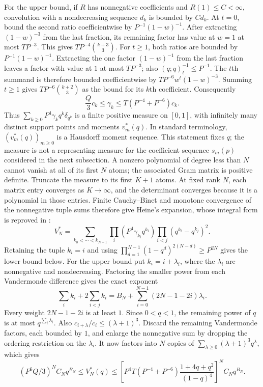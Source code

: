 For the upper bound, if $R$ has nonnegative coefficients and
$R(1)\le C<\infty$, convolution with a nondecreasing sequence $d_k$
is bounded by $Cd_k$. At $t=0$, bound the second ratio coefficientwise
by $P^{-1}(1-w)^{-1}$. After extracting $(1-w)^{-3}$ from the last
fraction, its remaining factor has value at $w=1$ at most $TP^{-3}$.
This gives $TP^{-4}\binom{k+3}3$.
For $t\ge1$, both ratios are bounded by $P^{-1}(1-w)^{-1}$.
Extracting the one factor $(1-w)^{-1}$ from the last fraction leaves
a factor with value at $1$ at most $TP^{-3}$; also $(q;q)_t^{-1}\le P^{-1}$.
The $t$th summand is therefore bounded coefficientwise by
$TP^{-6}w^t(1-w)^{-3}$. Summing $t\ge1$ gives
$TP^{-6}\binom{k+2}3$ as the bound for its $k$th coefficient. Consequently
\[
 \frac Q3 c_k\le\gamma_k\le T(P^{-4}+P^{-6})c_k.
\]
Thus $\sum_{k\ge0}P^4\gamma_kq^k\delta_{q^k}$ is a finite positive measure
on $[0,1]$, with infinitely many distinct support points and moments
$v_m^*(q)$. In standard terminology, $(v_m^*(q))_{m\ge0}$ is a
Hausdorff moment sequence. This statement fixes $q$; the measure is
not a representing measure for the coefficient sequence $s_m(p)$
considered in the next subsection.
A nonzero polynomial of degree less than $N$ cannot vanish at all of its
first $N$ atoms; the associated Gram matrix is positive definite.
Truncate the measure to its first $K+1$ atoms. At fixed rank $N$, each
matrix entry converges as $K\to\infty$, and the determinant converges
because it is a polynomial in those entries. Finite Cauchy--Binet and
monotone convergence of the nonnegative tuple sums therefore give
Heine's expansion, whose integral form is reproved in
\cite[Sec.~2, (2)--(5), pp.~2--3]{zudilin2017det}:
\[
 V_N^*=\sum_{k_0<\cdots<k_{N-1}}
 \prod_i(P^4\gamma_{k_i}q^{k_i})\prod_{i<j}(q^{k_i}-q^{k_j})^2.
\]
Retaining the tuple $k_i=i$ and using
$\prod_{d=1}^{N-1}(1-q^d)^{2(N-d)}\ge P^{2N}$ gives the lower bound
below. For the upper bound put $k_i=i+\lambda_i$, where the
$\lambda_i$ are nonnegative and nondecreasing. Factoring the smaller
power from each Vandermonde difference gives the exact exponent
\[
 \sum_i k_i+2\sum_{i<j}k_i
 =B_N+\sum_{i=0}^{N-1}(2N-1-2i)\lambda_i.
\]
Every weight $2N-1-2i$ is at least $1$. Since $0<q<1$, the remaining
power of $q$ is at most $q^{\sum_i\lambda_i}$. Also
$c_{i+\lambda}/c_i\le(\lambda+1)^3$. Discard the remaining
Vandermonde factors, each bounded by $1$, and enlarge the nonnegative
sum by dropping the ordering restriction on the $\lambda_i$.
It now factors into $N$ copies of $\sum_{\lambda\ge0}(\lambda+1)^3q^\lambda$,
which gives
\[
 (P^6Q/3)^N C_Nq^{B_N}\le V_N^*(q)
 \le\left[P^4T(P^{-4}+P^{-6})
          \frac{1+4q+q^2}{(1-q)^4}\right]^N C_Nq^{B_N}.
\]
